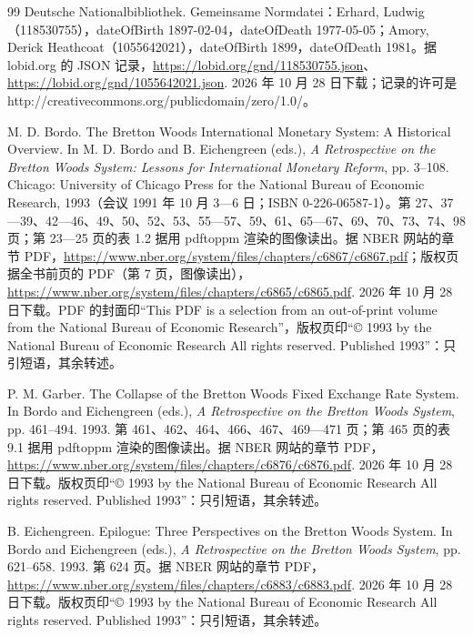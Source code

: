 \begin{thebibliography}{99}
 Deutsche Nationalbibliothek. Gemeinsame Normdatei：Erhard, Ludwig（118530755），dateOfBirth 1897-02-04，dateOfDeath 1977-05-05；Amory, Derick Heathcoat（1055642021），dateOfBirth 1899，dateOfDeath 1981。据 lobid.org 的 JSON 记录，\url{https://lobid.org/gnd/118530755.json}、\url{https://lobid.org/gnd/1055642021.json}. 2026 年 10 月 28 日下载；记录的许可是 http://creativecommons.org/publicdomain/zero/1.0/。

 M. D. Bordo. The Bretton Woods International Monetary System: A Historical Overview. In M. D. Bordo and B. Eichengreen (eds.), \emph{A Retrospective on the Bretton Woods System: Lessons for International Monetary Reform}, pp. 3--108. Chicago: University of Chicago Press for the National Bureau of Economic Research, 1993（会议 1991 年 10 月 3—6 日；ISBN 0-226-06587-1）。第 27、37—39、42—46、49、50、52、53、55—57、59、61、65—67、69、70、73、74、98 页；第 23—25 页的表 1.2 据用 pdftoppm 渲染的图像读出。据 NBER 网站的章节 PDF，\url{https://www.nber.org/system/files/chapters/c6867/c6867.pdf}；版权页据全书前页的 PDF（第 7 页，图像读出），\url{https://www.nber.org/system/files/chapters/c6865/c6865.pdf}. 2026 年 10 月 28 日下载。PDF 的封面印“This PDF is a selection from an out-of-print volume from the National Bureau of Economic Research”，版权页印“© 1993 by the National Bureau of Economic Research All rights reserved. Published 1993”：只引短语，其余转述。

 P. M. Garber. The Collapse of the Bretton Woods Fixed Exchange Rate System. In Bordo and Eichengreen (eds.), \emph{A Retrospective on the Bretton Woods System}, pp. 461--494. 1993. 第 461、462、464、466、467、469—471 页；第 465 页的表 9.1 据用 pdftoppm 渲染的图像读出。据 NBER 网站的章节 PDF，\url{https://www.nber.org/system/files/chapters/c6876/c6876.pdf}. 2026 年 10 月 28 日下载。版权页印“© 1993 by the National Bureau of Economic Research All rights reserved. Published 1993”：只引短语，其余转述。

 B. Eichengreen. Epilogue: Three Perspectives on the Bretton Woods System. In Bordo and Eichengreen (eds.), \emph{A Retrospective on the Bretton Woods System}, pp. 621--658. 1993. 第 624 页。据 NBER 网站的章节 PDF，\url{https://www.nber.org/system/files/chapters/c6883/c6883.pdf}. 2026 年 10 月 28 日下载。版权页印“© 1993 by the National Bureau of Economic Research All rights reserved. Published 1993”：只引短语，其余转述。


\end{thebibliography}
